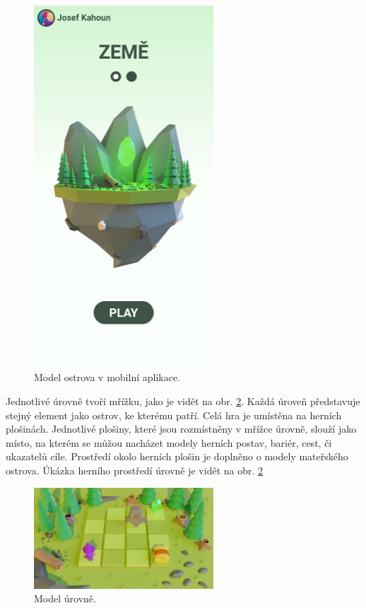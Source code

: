 \begin{figure}[h]
    \centering
    \includegraphics[width=0.6\textwidth]{img/mobilni-aplikace-ostrov.jpg}
    \caption{Model ostrova v mobilní aplikace.}
    \label{fig:mobilni-aplikace-ostrov}
\end{figure}

Jednotlivé úrovně tvoří mřížku, jako je vidět na obr. \ref{fig:model-levelu}. Každá úroveň představuje stejný element jako ostrov, ke kterému patří. Celá hra je umístěna na herních plošinách. Jednotlivé plošiny, které jsou rozmístněny v mřížce úrovně, slouží jako místo, na kterém se můžou nacházet modely herních postav, bariér, cest, či ukazatelů cíle. Prostředí okolo herních plošin je doplněno o modely mateřského ostrova. Úkázka herního prostředí úrovně je vidět na obr. \ref{fig:model-levelu}

\begin{figure}[h]
    \centering
    \includegraphics[width=0.6\textwidth]{img/model-levelu.png}
    \caption{Model úrovně.}
    \label{fig:model-levelu}
\end{figure}